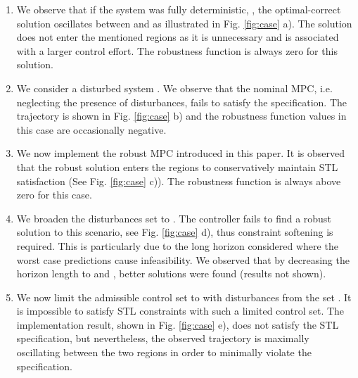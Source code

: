 \documentclass[letterpaper, 10 pt, conference]{ieeeconf}
\begin{document}
\begin{enumerate}

\item We observe that if the system was fully deterministic, , the optimal-correct solution oscillates between  and  as illustrated in Fig. \ref{fig:case} a). The solution does not enter the mentioned regions as it is unnecessary and is associated with a larger control effort. The robustness function is always zero for this solution. 

\item We consider a disturbed system . We observe that the nominal MPC, i.e. neglecting the presence of disturbances, fails to satisfy the specification. The trajectory is shown in Fig. \ref{fig:case} b) and the robustness function values in this case are occasionally negative.

\item We now implement the robust MPC introduced in this paper. It is observed that the robust solution enters the regions to conservatively maintain STL satisfaction (See Fig. \ref{fig:case} c)). The robustness function is always above zero for this case.

\item We broaden the disturbances set to  . The controller fails to find a robust solution to this scenario, see Fig. \ref{fig:case} d), thus constraint softening is required. This is particularly due to the long horizon considered where the worst case predictions cause infeasibility.  We observed that by decreasing the horizon length to  and , better solutions were found (results not shown). 

\item We now limit the admissible control set to  with disturbances from the set . It is impossible to satisfy STL constraints with such a limited control set. The implementation result, shown in Fig. \ref{fig:case} e), does not satisfy the STL specification, but nevertheless, the observed trajectory is maximally oscillating between the two regions in order to minimally violate the specification. 
\end{enumerate}
\end{document}
